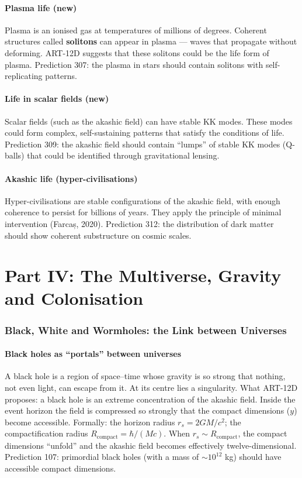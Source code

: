 \documentclass[11pt,a4paper]{article}
\begin{document}
\subsection{Plasma life (new)}
Plasma is an ionised gas at temperatures of millions of degrees. Coherent structures called \textbf{solitons} can appear in plasma --- waves that propagate without deforming. ART-12D suggests that these solitons could be the life form of plasma. Prediction 307: the plasma in stars should contain solitons with self-replicating patterns.

\subsection{Life in scalar fields (new)}
Scalar fields (such as the akashic field) can have stable KK modes. These modes could form complex, self-sustaining patterns that satisfy the conditions of life. Prediction 309: the akashic field should contain ``lumps'' of stable KK modes (Q-balls) that could be identified through gravitational lensing.

\subsection{Akashic life (hyper-civilisations)}
Hyper-civilisations are stable configurations of the akashic field, with enough coherence to persist for billions of years. They apply the principle of minimal intervention (Farcaș, 2020). Prediction 312: the distribution of dark matter should show coherent substructure on cosmic scales.

\newpage
\part*{Part IV: The Multiverse, Gravity and Colonisation}

\section{Black, White and Wormholes: the Link between Universes}
\subsection{Black holes as ``portals'' between universes}
A black hole is a region of space--time whose gravity is so strong that nothing, not even light, can escape from it. At its centre lies a singularity. What ART-12D proposes: a black hole is an extreme concentration of the akashic field. Inside the event horizon the field is compressed so strongly that the compact dimensions ($y$) become accessible. Formally: the horizon radius $r_s = 2GM/c^2$; the compactification radius $R_{\text{compact}} = \hbar/(Mc)$. When $r_s \sim R_{\text{compact}}$, the compact dimensions ``unfold'' and the akashic field becomes effectively twelve-dimensional. Prediction 107: primordial black holes (with a mass of $\sim 10^{12}$ kg) should have accessible compact dimensions.
\end{document}
